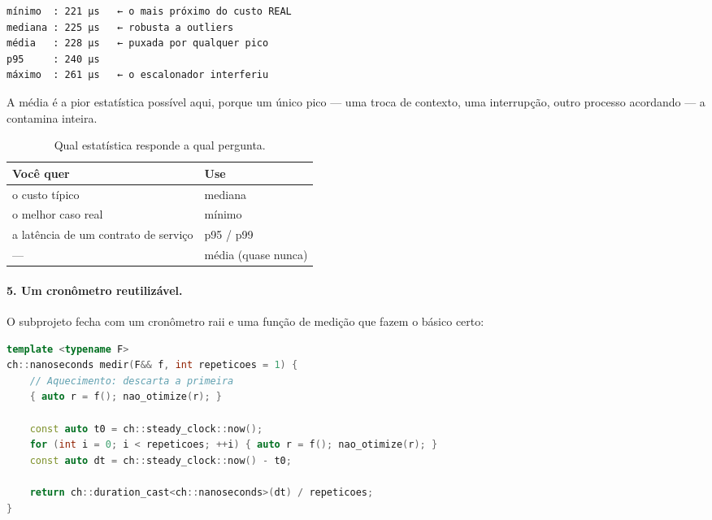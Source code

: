 \begin{lstlisting}[style=bt, language=bash,
    caption={Saída de \texttt{src/chrono/}: 21 execuções do mesmo trabalho.}]
mínimo  : 221 µs   ← o mais próximo do custo REAL
mediana : 225 µs   ← robusta a outliers
média   : 228 µs   ← puxada por qualquer pico
p95     : 240 µs
máximo  : 261 µs   ← o escalonador interferiu
\end{lstlisting}

A média é a pior estatística possível aqui, porque um único pico --- uma troca
de contexto, uma interrupção, outro processo acordando --- a contamina inteira.

\begin{table}[htbp]
\centering
\caption{Qual estatística responde a qual pergunta.}
\label{tab:estatistica-bench}
\footnotesize
\begin{tabular}{@{}ll@{}}
\toprule
\textbf{Você quer} & \textbf{Use} \\
\midrule
o custo típico             & mediana \\
o melhor caso real         & mínimo \\
a latência de um contrato de serviço & p95 / p99 \\
---                        & média (quase nunca) \\
\bottomrule
\end{tabular}
\end{table}

\paragraph{5. Um cronômetro reutilizável.} O subprojeto fecha com um cronômetro
\gls{raii} e uma função de medição que fazem o básico certo:

\begin{lstlisting}[style=bt, language=C++,
    caption={Transcrição de \texttt{src/chrono/demo\_medicao.hpp}: aquecimento,
             repetição e barreira, em oito linhas.}]
template <typename F>
ch::nanoseconds medir(F&& f, int repeticoes = 1) {
    // Aquecimento: descarta a primeira
    { auto r = f(); nao_otimize(r); }

    const auto t0 = ch::steady_clock::now();
    for (int i = 0; i < repeticoes; ++i) { auto r = f(); nao_otimize(r); }
    const auto dt = ch::steady_clock::now() - t0;

    return ch::duration_cast<ch::nanoseconds>(dt) / repeticoes;
}
\end{lstlisting}

